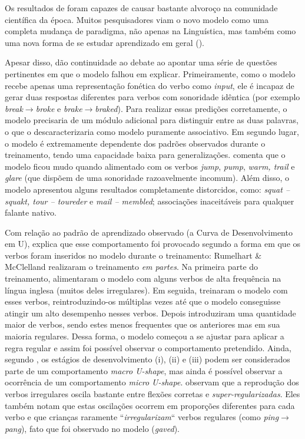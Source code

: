 Os resultados de \cite{rumelhart:1986} foram capazes de causar bastante alvoroço na comunidade científica da época. Muitos pesquisadores viam o novo modelo como uma completa mudança de paradigma, não apenas na Linguística, mas também como uma nova forma de se estudar aprendizado em geral (\cite{Schneider1987}). 

Apesar disso, \cite{Pinker:1988} dão continuidade ao debate ao apontar uma série de questões pertinentes em que o modelo falhou em explicar. Primeiramente, como o modelo recebe apenas uma representação fonética do verbo como \textit{input}, ele é incapaz de gerar duas respostas diferentes para verbos com sonoridade idêntica (por exemplo \textit{break}$\rightarrow$\textit{broke} e \textit{brake}$\rightarrow$\textit{braked}). Para realizar essas predições corretamente, o modelo precisaria de um módulo adicional para distinguir entre as duas palavras, o que o descaracterizaria como modelo puramente associativo. Em segundo lugar, o modelo é extremamente dependente dos padrões observados durante o treinamento, tendo uma capacidade baixa para generalizações. \cite{Pinker:1999} comenta que o modelo ficou mudo quando alimentado com os verbos \textit{jump}, \textit{pump}, \textit{warm, trail} e \textit{glare} (que dispõem de uma sonoridade razoavelmente incomum). Além disso, o modelo apresentou alguns resultados completamente distorcidos, como: \textit{squat – squakt, tour – toureder} e \textit{mail – membled}; associações inaceitáveis para qualquer falante nativo. 

Com relação ao padrão de aprendizado observado (a Curva de Desenvolvimento em U), \cite{Pinker:1999} explica que esse comportamento foi provocado segundo a forma em que os verbos foram inseridos no modelo durante o treinamento: Rumelhart & McClelland realizaram o treinamento \textit{em partes}. Na primeira parte do treinamento, alimentaram o modelo com alguns verbos de alta frequência na língua inglesa (muitos deles irregulares). Em seguida, treinaram o modelo com esses verbos, reintroduzindo-os múltiplas vezes até que o modelo conseguisse atingir um alto desempenho nesses verbos. Depois introduziram uma quantidade maior de verbos, sendo estes menos frequentes que os anteriores mas em sua maioria regulares. Dessa forma, o modelo começou a se ajustar para aplicar a regra regular e assim foi possível observar o comportamento pretendido. Ainda, segundo \cite{pluket:1991}, os estágios de desenvolvimento (i), (ii) e (iii) podem ser considerados parte de um comportamento \textit{macro U-shape}, mas ainda é possível observar a ocorrência de um comportamento \textit{micro U-shape}. \cite{pluket:1991} observam que a reprodução dos verbos irregulares oscila bastante entre flexões corretas e \textit{super-regularizadas}. Eles também notam que estas oscilações ocorrem em proporções diferentes para cada verbo e que crianças raramente “\textit{irregularizam}“ verbos regulares (como \textit{ping}$\rightarrow$\textit{pang}), fato que foi observado no modelo (\textit{gaved}).\\



